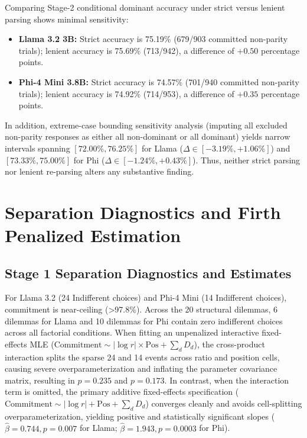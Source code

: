 \documentclass[10pt,journal,compsoc]{IEEEtran}
\begin{document}
Comparing Stage-2 conditional dominant accuracy under strict versus lenient parsing shows minimal sensitivity:
\begin{itemize}
  \item \textbf{Llama 3.2 3B:} Strict accuracy is 75.19\% (679/903 committed non-parity trials); lenient accuracy is 75.69\% (713/942), a difference of $+0.50$ percentage points.
  \item \textbf{Phi-4 Mini 3.8B:} Strict accuracy is 74.57\% (701/940 committed non-parity trials); lenient accuracy is 74.92\% (714/953), a difference of $+0.35$ percentage points.
\end{itemize}
In addition, extreme-case bounding sensitivity analysis (imputing all excluded non-parity responses as either all non-dominant or all dominant) yields narrow intervals spanning $[72.00\%, 76.25\%]$ for Llama ($\Delta \in [-3.19\%, +1.06\%]$) and $[73.33\%, 75.00\%]$ for Phi ($\Delta \in [-1.24\%, +0.43\%]$). Thus, neither strict parsing nor lenient re-parsing alters any substantive finding.

\section{Separation Diagnostics and Firth Penalized Estimation}

\subsection{Stage 1 Separation Diagnostics and Estimates}
For Llama 3.2 (24 Indifferent choices) and Phi-4 Mini (14 Indifferent choices), commitment is near-ceiling (>97.8\%). Across the 20 structural dilemmas, 6 dilemmas for Llama and 10 dilemmas for Phi contain zero indifferent choices across all factorial conditions. When fitting an unpenalized interactive fixed-effects MLE ($\text{Commitment} \sim |\log r| \times \text{Pos} + \sum_d D_d$), the cross-product interaction splits the sparse 24 and 14 events across ratio and position cells, causing severe overparameterization and inflating the parameter covariance matrix, resulting in $p=0.235$ and $p=0.173$. In contrast, when the interaction term is omitted, the primary additive fixed-effects specification ($\text{Commitment} \sim |\log r| + \text{Pos} + \sum_d D_d$) converges cleanly and avoids cell-splitting overparameterization, yielding positive and statistically significant slopes ($\hat\beta=0.744, p=0.007$ for Llama; $\hat\beta=1.943, p=0.0003$ for Phi).
\end{document}
